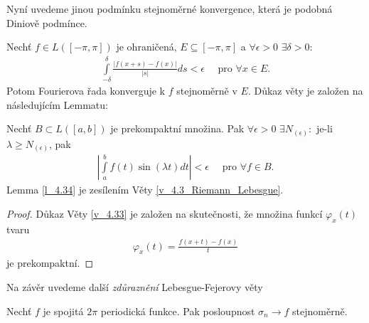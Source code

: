Nyní uvedeme jinou podmínku stejnoměrné konvergence, která je podobná Diniově podmínce.

\begin{theorem}\label{v_4.33}
Nechť $f \in L([-\pi, \pi])$ je ohraničená, $E \subseteq [-\pi, \pi]$ a $\forall \epsilon > 0$ $\exists \delta > 0$:
\begin{align*}
\int \limits_{-\delta}^\delta \frac{|f (x + s) - f (x)|}{|s|} ds < \epsilon \quad \textrm{ pro } \forall x \in E.
\end{align*}
Potom Fourierova řada konverguje k $f$ stejnoměrně v $E$.
Důkaz věty je založen na následujícím Lemmatu:
\end{theorem}

\begin{lemma}\label{l_4.34}
Nechť $B \subset L ([a, b])$ je prekompaktní množina. Pak $\forall \epsilon > 0$ $\exists N_{(\epsilon)} : $ je-li $\lambda \geq N_{(\epsilon)}$, pak
\begin{align*}
\left| \int \limits_a^b f(t) \sin (\lambda t) dt \right| < \epsilon \quad \textrm{ pro } \forall f \in B.
\end{align*}
Lemma \ref{l_4.34} je zesílením Věty \ref{v_4.3_Riemann_Lebesgue}.
\begin{proof}
Důkaz Věty \ref{v_4.33} je založen na skutečnosti, že množina funkcí $\varphi_x (t)$ tvaru
\begin{align*}
\varphi_x (t) = \frac{f (x + t) - f(x)}{t}
\end{align*}
je prekompaktní.
\end{proof}
\end{lemma}

Na závěr uvedeme další \textit{zdůraznění} Lebesgue-Fejerovy věty

\begin{theorem}[Fejer]\label{vztah_4.35}
Nechť $f$ je spojitá $2\pi$ periodická funkce. Pak posloupnost $\sigma_n \rightarrow f$ stejnoměrně.
\end{theorem}


